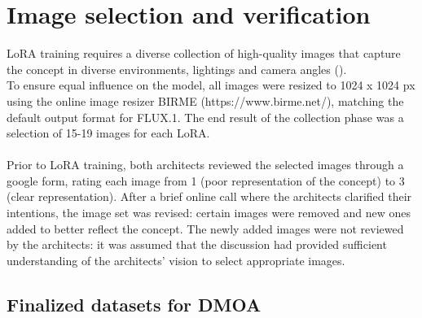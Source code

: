 \section{Image selection and verification} \label{sec:Finalized training datasets}
LoRA training requires a diverse collection of high-quality images that capture the concept in diverse environments, lightings and camera angles (\cite{deepfates_fine-tune_2024}).\\
To ensure equal influence on the model, all images were resized to 1024 x 1024 px using the online image resizer BIRME (https://www.birme.net/), matching the default output format for FLUX.1. The end result of the collection phase was a selection of 15-19 images for each LoRA.\\~\\
Prior to LoRA training, both architects reviewed the selected images through a google form, rating each image from 1 (poor representation of the concept) to 3 (clear representation). After a brief online call where the architects clarified their intentions, the image set was revised: certain images were removed and new ones added to better reflect the concept. The newly added images were not reviewed by the architects: it was assumed that the discussion had provided sufficient understanding of the architects' vision to select appropriate images.
\subsection{Finalized datasets for DMOA}
